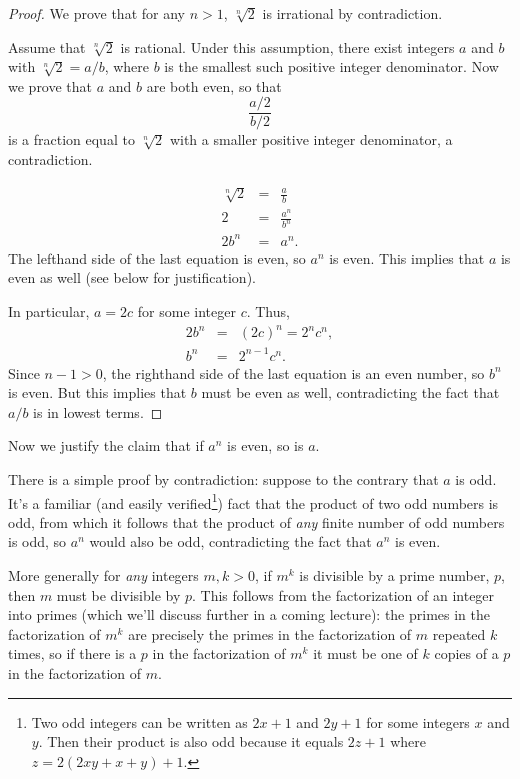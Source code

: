 \documentclass[handout]{mcs}
\begin{document}
\begin{problem}
\begin{solution}

\begin{proof}
We prove that for any $n>1$, $\sqrt[n]{2}$ is irrational by
contradiction.

Assume that $\sqrt[n]{2}$ is rational.  Under this assumption, there exist
integers $a$ and $b$ with $\sqrt[n]{2} = a/b$, where $b$ is the smallest
such positive integer denominator.  Now we prove that $a$ and $b$ are both
even, so that
         \[
        \frac{a/2}{b/2}
        \]
  is a fraction equal to $\sqrt[n]{2}$ with a smaller positive integer
  denominator, a contradiction.

\begin{eqnarray*}
\sqrt[n]{2} & = & \frac{a}{b}\\
2 & = & \frac{a^{n}}{b^{n}}\\
2b^{n} & = & a^{n}.
\end{eqnarray*}
The lefthand side of the last equation is even, so $a^{n}$ is even.  This
implies that $a$ is even as well (see below for justification).

In particular, $a = 2c$ for some integer $c$.  Thus, 
\begin{eqnarray*}
2b^{n} & = & (2c)^n = 2^{n}c^{n},\\
b^{n} & = & 2^{n-1}c^{n}.
\end{eqnarray*}
Since $n-1>0$, the righthand side of the last equation is an even number,
so $b^{n}$ is even.  But this implies that $b$ must be even as well,
contradicting the fact that $a/b$ is in lowest terms.
\end{proof}

Now we justify the claim that if $a^n$ is even, so is $a$.

There is a simple proof by contradiction: suppose to the contrary that $a$
is odd.  It's a familiar (and easily verified\footnote{Two odd integers
  can be written as $2x+1$ and $2y+1$ for some integers $x$ and $y$.  Then
  their product is also odd because it equals $2z +1$ where $z=
  2(2xy+x+y)+1$.}) fact that the product of two odd numbers is odd, from
which it follows that the product of \emph{any} finite number of odd
numbers is odd, so $a^n$ would also be odd, contradicting the fact that
$a^n$ is even.

More generally for \emph{any} integers $m,k >0$, if $m^k$ is divisible
by a prime number, $p$, then $m$ must be divisible by $p$.  This follows
from the factorization of an integer into primes (which we'll discuss
further in a coming lecture): the primes in the factorization of $m^k$ are
precisely the primes in the factorization of $m$ repeated $k$ times, so if
there is a $p$ in the factorization of $m^k$ it must be one of $k$ copies
of a $p$ in the factorization of $m$.

\end{solution}
\end{problem}
\end{document}
